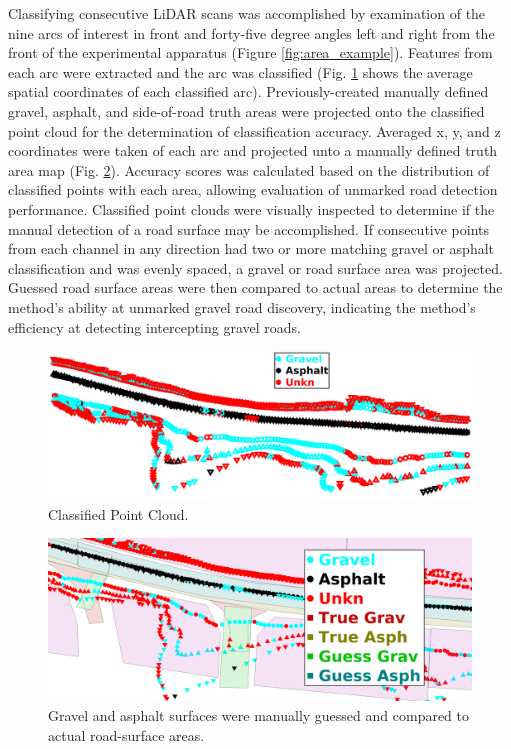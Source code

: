 \documentclass[journal,onecolumn]{IEEEtran}
\begin{document}
			{Classifying consecutive LiDAR scans was accomplished by examination of the nine arcs of interest in front and forty-five degree angles left and right from the front of the experimental apparatus (Figure \ref{fig:area_example}). Features from each arc were extracted and the arc was classified (Fig. \ref{fig:raw_classification_results} shows the average spatial coordinates of each classified arc). Previously-created manually defined gravel, asphalt, and side-of-road truth areas were projected onto the classified point cloud for the determination of classification accuracy. Averaged x, y, and z coordinates were taken of each arc and projected unto a manually defined truth area map (Fig. \ref{fig:rm_db_4_toc}). Accuracy scores was calculated based on the distribution of classified points with each area, allowing evaluation of unmarked road detection performance. Classified point clouds were visually inspected to determine if the manual detection of a road surface may be accomplished.  If consecutive points from each channel in any direction had two or more matching gravel or asphalt classification and was evenly spaced, a gravel or road surface area was projected. Guessed road surface areas were then compared to actual areas to determine the method's ability at unmarked gravel road discovery, indicating the method's efficiency at detecting intercepting gravel roads. }
			

			\begin{figure}[H]
				\centering
				\includegraphics[width=0.9\linewidth]{figures/raw_classification_results_v3}
				\caption[Classified Point Cloud]{Classified Point Cloud.}
				\label{fig:raw_classification_results}
			\end{figure}
		
			\begin{figure}[H]
				\centering
				\includegraphics[width=0.9\linewidth]{figures/rm_db_4_ToC_22}
				\caption[Projected Guess vs Truth]{Gravel and asphalt surfaces were manually guessed and compared to actual road-surface areas. }
				\label{fig:rm_db_4_toc}
			\end{figure}
				
\end{document}
